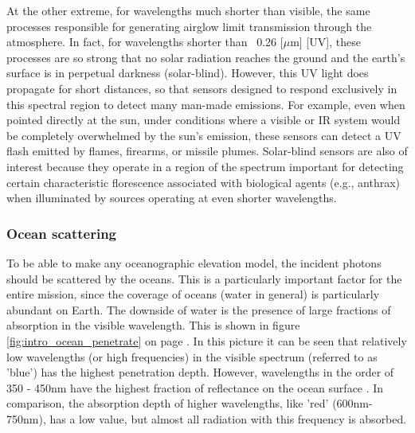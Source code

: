 At the other extreme, for wavelengths much shorter than visible, the same processes responsible for generating airglow limit transmission through the atmosphere. In fact, for wavelengths shorter than ~0.26 [$\mu$m] [\ac{UV}], these processes are so strong that no solar radiation reaches the ground and the earth's surface is in perpetual darkness (solar-blind). However, this \acs{UV} light does propagate for short distances, so that sensors designed to respond exclusively in this spectral region to detect many man-made emissions. For example, even when pointed directly at the sun, under conditions where a visible or \ac{IR} system would be completely overwhelmed by the sun's emission, these sensors can detect a UV flash emitted by flames, firearms, or missile plumes. Solar-blind sensors are also of interest because they operate in a region of the spectrum important for detecting certain characteristic florescence associated with biological agents (e.g., anthrax) when illuminated by sources operating at even shorter wavelengths. 

\subsubsection{Ocean scattering}
\label{introOcean}
To be able to make any oceanographic elevation model, the incident photons should be scattered by the oceans. This is a particularly important factor for the entire mission, since the coverage of oceans (water in general) is particularly abundant on Earth. The downside of water is the presence of large fractions of absorption in the visible wavelength. This is shown in figure \ref{fig:intro_ocean_penetrate} on page \pageref{fig:intro_ocean_penetrate}. In this picture it can be seen that relatively low wavelengths (or high frequencies) in the visible spectrum (referred to as 'blue') has the highest penetration depth. However, wavelengths in the order of 350 - 450nm have the highest fraction of reflectance on the ocean surface \cite{ocean_scattering}. In comparison, the absorption depth of higher wavelengths, like 'red' (600nm-750nm), has a low value, but almost all radiation with this frequency is absorbed. 

